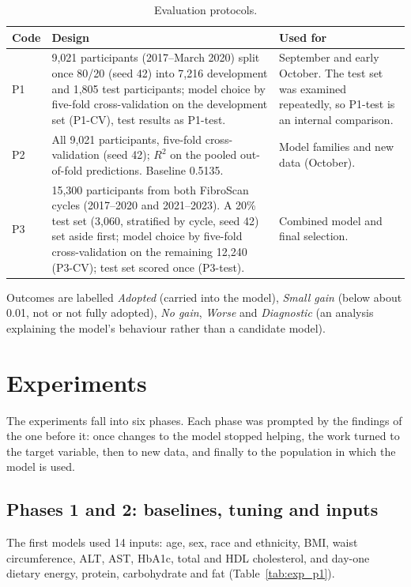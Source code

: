 \begin{table}[htbp]
\centering
\caption{Evaluation protocols.}
\label{tab:exp_protocols}
\begin{tabular}{p{1cm}p{8.5cm}p{4.5cm}}
\toprule
Code & Design & Used for \\
\midrule
P1 & 9,021 participants (2017--March 2020) split once 80/20 (seed 42) into 7,216 development and 1,805 test participants; model choice by five-fold cross-validation on the development set (P1-CV), test results as P1-test. & September and early October. The test set was examined repeatedly, so P1-test is an internal comparison. \\
P2 & All 9,021 participants, five-fold cross-validation (seed 42); $R^2$ on the pooled out-of-fold predictions. Baseline 0.5135. & Model families and new data (October). \\
P3 & 15,300 participants from both FibroScan cycles (2017--2020 and 2021--2023). A 20\% test set (3,060, stratified by cycle, seed 42) set aside first; model choice by five-fold cross-validation on the remaining 12,240 (P3-CV); test set scored once (P3-test). & Combined model and final selection. \\
\bottomrule
\end{tabular}
\end{table}

Outcomes are labelled \emph{Adopted} (carried into the model), \emph{Small
gain} (below about 0.01, not or not fully adopted), \emph{No gain},
\emph{Worse} and \emph{Diagnostic} (an analysis explaining the model's
behaviour rather than a candidate model).

\section{Experiments}
\label{sec:exp_phases}

The experiments fall into six phases. Each phase was prompted by the
findings of the one before it: once changes to the model stopped helping,
the work turned to the target variable, then to new data, and finally to the
population in which the model is used.

\subsection{Phases 1 and 2: baselines, tuning and inputs}

The first models used 14 inputs: age, sex, race and ethnicity, BMI, waist
circumference, ALT, AST, HbA1c, total and HDL cholesterol, and day-one
dietary energy, protein, carbohydrate and fat (Table~\ref{tab:exp_p1}).

